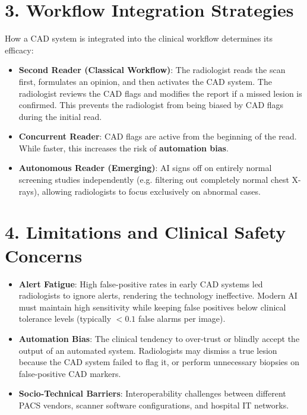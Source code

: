 \section*{3. Workflow Integration Strategies}
How a CAD system is integrated into the clinical workflow determines its efficacy:
\begin{itemize}
    \item \textbf{Second Reader (Classical Workflow)}: The radiologist reads the scan first, formulates an opinion, and then activates the CAD system. The radiologist reviews the CAD flags and modifies the report if a missed lesion is confirmed. This prevents the radiologist from being biased by CAD flags during the initial read.
    \item \textbf{Concurrent Reader}: CAD flags are active from the beginning of the read. While faster, this increases the risk of \textbf{automation bias}.
    \item \textbf{Autonomous Reader (Emerging)}: AI signs off on entirely normal screening studies independently (e.g. filtering out completely normal chest X-rays), allowing radiologists to focus exclusively on abnormal cases.
\end{itemize}


\section*{4. Limitations and Clinical Safety Concerns}
\begin{itemize}
    \item \textbf{Alert Fatigue}: High false-positive rates in early CAD systems led radiologists to ignore alerts, rendering the technology ineffective. Modern AI must maintain high sensitivity while keeping false positives below clinical tolerance levels (typically $< 0.1$ false alarms per image).
    \item \textbf{Automation Bias}: The clinical tendency to over-trust or blindly accept the output of an automated system. Radiologists may dismiss a true lesion because the CAD system failed to flag it, or perform unnecessary biopsies on false-positive CAD markers.
    \item \textbf{Socio-Technical Barriers}: Interoperability challenges between different PACS vendors, scanner software configurations, and hospital IT networks.
\end{itemize}

\clearpage
